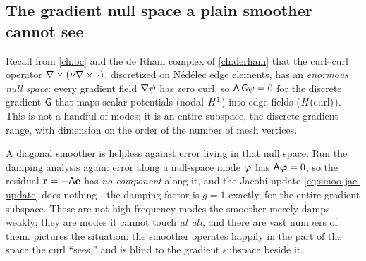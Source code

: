 \subsection{The gradient null space a plain smoother cannot see}

Recall from \cref{ch:bc} and the de Rham complex of \cref{ch:derham} that the
curl--curl operator $\nabla\times(\nu\nabla\times\,\cdot)$, discretized on Nédélec edge elements,
has an \emph{enormous null space}: every gradient field $\nabla\psi$ has zero curl,
so $\mathsf{A}\,\mathsf{G}\psi = 0$ for the discrete gradient $\mathsf{G}$ that maps scalar
potentials (nodal $H^1$) into edge fields ($H(\mathrm{curl})$). This is not a handful of
modes; it is an entire subspace, the discrete gradient range, with dimension on the
order of the number of mesh vertices.

A diagonal smoother is helpless against error living in that null space. Run the
damping analysis again: error along a null-space mode $\boldsymbol{\varphi}$ has $\mathsf{A}\boldsymbol{\varphi}=0$,
so the residual $\mathbf{r}=-\mathsf{A}\mathbf{e}$ has \emph{no component} along it, and the Jacobi
update \cref{eq:smoo-jac-update} does nothing---the damping factor is $g=1$ exactly,
for the entire gradient subspace. These are not high-frequency modes the smoother
merely damps weakly; they are modes it cannot touch \emph{at all}, and there are
vast numbers of them.  pictures the situation: the smoother
operates happily in the part of the space the curl ``sees,'' and is blind to the
gradient subspace beside it.

